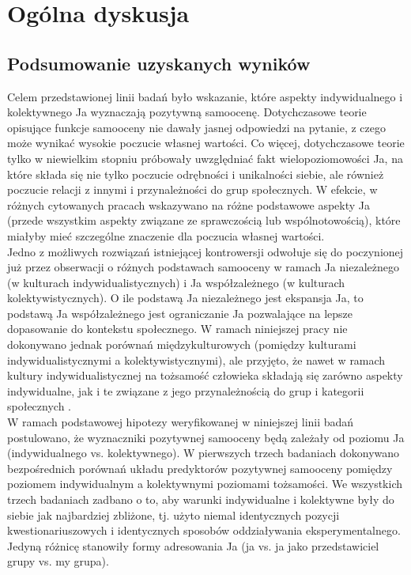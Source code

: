 \documentclass[man]{apa6}
\begin{document}
\newpage
\section{Ogólna dyskusja}

\subsection{Podsumowanie uzyskanych wyników}

Celem przedstawionej linii badań było wskazanie, które aspekty indywidualnego i kolektywnego Ja wyznaczają pozytywną samoocenę. Dotychczasowe teorie opisujące funkcje samooceny \parencite[np.,][]{pyszczynski2004people, leary2000nature} nie dawały jasnej odpowiedzi na pytanie, z czego może wynikać wysokie poczucie własnej wartości. Co więcej, dotychczasowe teorie tylko w niewielkim stopniu próbowały uwzględniać fakt wielopoziomowości Ja, na które składa się nie tylko poczucie odrębności i unikalności siebie, ale również poczucie relacji z innymi i przynależności do grup społecznych. W efekcie, w różnych cytowanych pracach wskazywano na różne podstawowe aspekty Ja (przede wszystkim aspekty związane ze sprawczością lub wspólnotowością), które miałyby mieć szczególne znaczenie dla poczucia własnej wartości.\\

Jedno z możliwych rozwiązań istniejącej kontrowersji odwołuje się do poczynionej już przez \textcite{markus1991culture} obserwacji o różnych podstawach samooceny w ramach Ja niezależnego (w kulturach indywidualistycznych) i Ja współzależnego (w kulturach kolektywistycznych). O ile podstawą Ja niezależnego jest ekspansja Ja, to podstawą Ja współzależnego jest ograniczanie Ja pozwalające na lepsze dopasowanie do kontekstu społecznego. W ramach niniejszej pracy nie dokonywano jednak porównań międzykulturowych (pomiędzy kulturami indywidualistycznymi a kolektywistycznymi), ale przyjęto, że nawet w ramach kultury indywidualistycznej na tożsamość człowieka składają się zarówno aspekty indywidualne, jak i te związane z jego przynależnością do grup i kategorii społecznych \parencite[np.,][]{brewer1996we, turner1987rediscovering}. \\

W ramach podstawowej hipotezy weryfikowanej w niniejszej linii badań postulowano, że wyznaczniki pozytywnej samooceny będą zależały od poziomu Ja (indywidualnego vs. kolektywnego). W pierwszych trzech badaniach dokonywano bezpośrednich porównań układu predyktorów pozytywnej samooceny pomiędzy poziomem indywidualnym a kolektywnymi poziomami tożsamości. We wszystkich trzech badaniach zadbano o to, aby warunki indywidualne i kolektywne były do siebie jak najbardziej zbliżone, tj. użyto niemal identycznych pozycji kwestionariuszowych i identycznych sposobów oddziaływania eksperymentalnego. Jedyną różnicę stanowiły formy adresowania Ja (ja vs. ja jako przedstawiciel grupy vs. my grupa).\\
\end{document}
